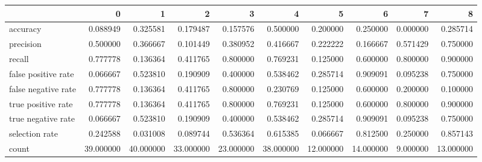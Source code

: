 \begin{tabular}{lrrrrrrrrr}
\toprule
{} &          0 &          1 &          2 &          3 &          4 &          5 &          6 &         7 &          8 \\
\midrule
accuracy            &   0.088949 &   0.325581 &   0.179487 &   0.157576 &   0.500000 &   0.200000 &   0.250000 &  0.000000 &   0.285714 \\
precision           &   0.500000 &   0.366667 &   0.101449 &   0.380952 &   0.416667 &   0.222222 &   0.166667 &  0.571429 &   0.750000 \\
recall              &   0.777778 &   0.136364 &   0.411765 &   0.800000 &   0.769231 &   0.125000 &   0.600000 &  0.800000 &   0.900000 \\
false positive rate &   0.066667 &   0.523810 &   0.190909 &   0.400000 &   0.538462 &   0.285714 &   0.909091 &  0.095238 &   0.750000 \\
false negative rate &   0.777778 &   0.136364 &   0.411765 &   0.800000 &   0.230769 &   0.125000 &   0.600000 &  0.200000 &   0.100000 \\
true positive rate  &   0.777778 &   0.136364 &   0.411765 &   0.800000 &   0.769231 &   0.125000 &   0.600000 &  0.800000 &   0.900000 \\
true negative rate  &   0.066667 &   0.523810 &   0.190909 &   0.400000 &   0.538462 &   0.285714 &   0.909091 &  0.095238 &   0.750000 \\
selection rate      &   0.242588 &   0.031008 &   0.089744 &   0.536364 &   0.615385 &   0.066667 &   0.812500 &  0.250000 &   0.857143 \\
count               &  39.000000 &  40.000000 &  33.000000 &  23.000000 &  38.000000 &  12.000000 &  14.000000 &  9.000000 &  13.000000 \\
\bottomrule
\end{tabular}
